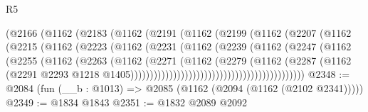 \begin{lexlean}{R5}
\begin{coremodule}
                                (@2166
                                  (@1162
                                    (@2183
                                      (@1162
                                        (@2191
                                          (@1162
                                            (@2199
                                              (@1162
                                                (@2207
                                                  (@1162
                                                    (@2215
                                                      (@1162
                                                        (@2223
                                                          (@1162
                                                            (@2231
                                                              (@1162
                                                                (@2239
                                                                  (@1162
                                                                    (@2247
                                                                      (@1162
                                                                        (@2255
                                                                          (@1162
                                                                            (@2263
                                                                              (@1162
                                                                                (@2271
                                                                                  (@1162
                                                                                    (@2279
                                                                                      (@1162
                                                                                        (@2287
                                                                                          (@1162
                                                                                            (@2291
                                                                                              @2293
                                                                                              @1218
                                                                                              @1405)))))))))))))))))))))))))))))))))))))))))))))
@2348 := @2084 (fun (__b : @1013) => @2085 (@1162 (@2094 (@1162 (@2102 @2341)))))
@2349 := @1834 @1843
@2351 := @1832 @2089 @2092

\end{coremodule}
\end{lexlean}
